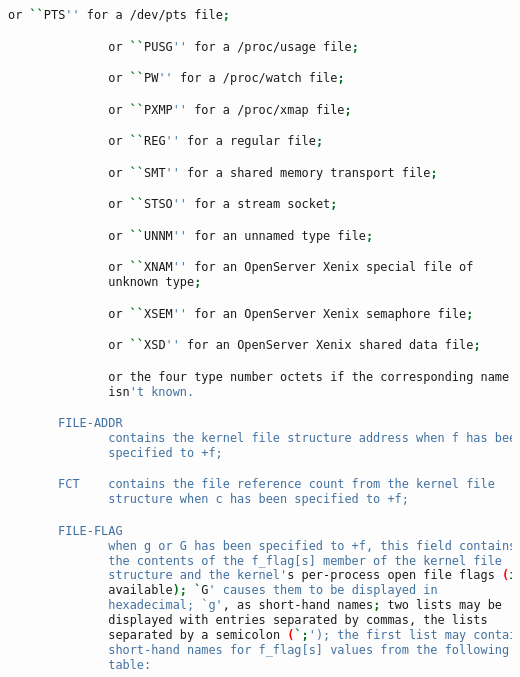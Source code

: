 {{\begin{lstlisting}[language=bash]
              or ``PTS'' for a /dev/pts file;

              or ``PUSG'' for a /proc/usage file;

              or ``PW'' for a /proc/watch file;

              or ``PXMP'' for a /proc/xmap file;

              or ``REG'' for a regular file;

              or ``SMT'' for a shared memory transport file;

              or ``STSO'' for a stream socket;

              or ``UNNM'' for an unnamed type file;

              or ``XNAM'' for an OpenServer Xenix special file of
              unknown type;

              or ``XSEM'' for an OpenServer Xenix semaphore file;

              or ``XSD'' for an OpenServer Xenix shared data file;

              or the four type number octets if the corresponding name
              isn't known.

       FILE-ADDR
              contains the kernel file structure address when f has been
              specified to +f;

       FCT    contains the file reference count from the kernel file
              structure when c has been specified to +f;

       FILE-FLAG
              when g or G has been specified to +f, this field contains
              the contents of the f_flag[s] member of the kernel file
              structure and the kernel's per-process open file flags (if
              available); `G' causes them to be displayed in
              hexadecimal; `g', as short-hand names; two lists may be
              displayed with entries separated by commas, the lists
              separated by a semicolon (`;'); the first list may contain
              short-hand names for f_flag[s] values from the following
              table:


\end{lstlisting}}}

